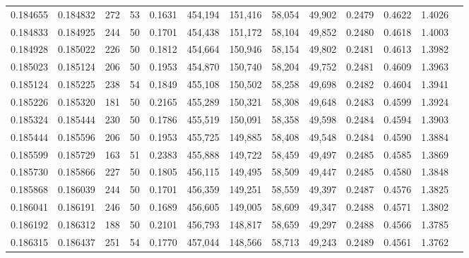 \begin{tabular}{rrrrrrrrrrrrr}
0.184655 & 0.184832 &   272 &  53 &                                     0.1631 & 454,194 & 151,416 &  58,054 &  49,902 & 0.2479 & 0.4622 & 1.4026 \\
0.184833 & 0.184925 &   244 &  50 &                                     0.1701 & 454,438 & 151,172 &  58,104 &  49,852 & 0.2480 & 0.4618 & 1.4003 \\
0.184928 & 0.185022 &   226 &  50 &                                     0.1812 & 454,664 & 150,946 &  58,154 &  49,802 & 0.2481 & 0.4613 & 1.3982 \\
0.185023 & 0.185124 &   206 &  50 &                                     0.1953 & 454,870 & 150,740 &  58,204 &  49,752 & 0.2481 & 0.4609 & 1.3963 \\
0.185124 & 0.185225 &   238 &  54 &                                     0.1849 & 455,108 & 150,502 &  58,258 &  49,698 & 0.2482 & 0.4604 & 1.3941 \\
0.185226 & 0.185320 &   181 &  50 &                                     0.2165 & 455,289 & 150,321 &  58,308 &  49,648 & 0.2483 & 0.4599 & 1.3924 \\
0.185324 & 0.185444 &   230 &  50 &                                     0.1786 & 455,519 & 150,091 &  58,358 &  49,598 & 0.2484 & 0.4594 & 1.3903 \\
0.185444 & 0.185596 &   206 &  50 &                                     0.1953 & 455,725 & 149,885 &  58,408 &  49,548 & 0.2484 & 0.4590 & 1.3884 \\
0.185599 & 0.185729 &   163 &  51 &                                     0.2383 & 455,888 & 149,722 &  58,459 &  49,497 & 0.2485 & 0.4585 & 1.3869 \\
0.185730 & 0.185866 &   227 &  50 &                                     0.1805 & 456,115 & 149,495 &  58,509 &  49,447 & 0.2485 & 0.4580 & 1.3848 \\
0.185868 & 0.186039 &   244 &  50 &                                     0.1701 & 456,359 & 149,251 &  58,559 &  49,397 & 0.2487 & 0.4576 & 1.3825 \\
0.186041 & 0.186191 &   246 &  50 &                                     0.1689 & 456,605 & 149,005 &  58,609 &  49,347 & 0.2488 & 0.4571 & 1.3802 \\
0.186192 & 0.186312 &   188 &  50 &                                     0.2101 & 456,793 & 148,817 &  58,659 &  49,297 & 0.2488 & 0.4566 & 1.3785 \\
0.186315 & 0.186437 &   251 &  54 &                                     0.1770 & 457,044 & 148,566 &  58,713 &  49,243 & 0.2489 & 0.4561 & 1.3762 \\

\end{tabular}
